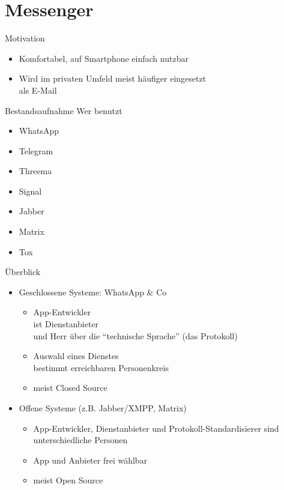 \section{Messenger}
\begin{frame}{Motivation}
\begin{itemize}
\item Komfortabel, auf Smartphone einfach nutzbar
\item Wird im privaten Umfeld meist häufiger eingesetzt\\ als E-Mail
\end{itemize}

\pause
\begin{block}{Bestandsaufnahme}
Wer benutzt
\begin{itemize}
\item<+-> WhatsApp
\item<+-> Telegram
\item<+-> Threema
\item<+-> Signal
\item<+-> Jabber
\item<+-> Matrix
\item<+-> Tox
\end{itemize}
\end{block}
\end{frame}

\begin{frame}{Überblick}
  \begin{itemize}
    \item Geschlossene Systeme: WhatsApp \& Co
      \begin{itemize}
        \item App-Entwickler\\
          ist Dienstanbieter\\
          und Herr über die ``technische Sprache'' (das Protokoll)
        \item Auswahl eines Dienstes\\bestimmt erreichbaren Personenkreis
        \item meist Closed Source
      \end{itemize}
    \item Offene Systeme (z.B. Jabber/XMPP, Matrix)
      \begin{itemize}
        \item App-Entwickler, Dienstanbieter und Protokoll-Standardisierer sind unterschiedliche Personen
        \item App und Anbieter frei wählbar
        \item meist Open Source
      \end{itemize}
  \end{itemize}
\end{frame}

